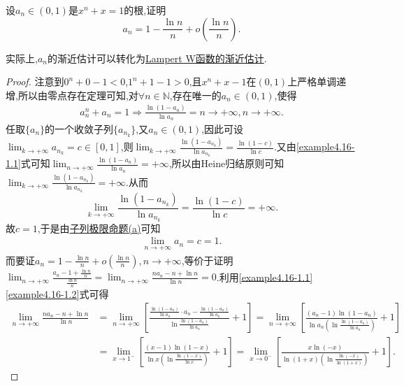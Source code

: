 \documentclass[../../main.tex]{subfiles}%
\begin{document}
\begin{example}
设\(a_n\in(0,1)\)是\(x^n + x = 1\)的根,证明
\[
a_n=1-\frac{\ln n}{n}+o\left(\frac{\ln n}{n}\right).
\]
\end{example}
\begin{note}
实际上,$a_n$的渐近估计可以转化为\hyperref[proposition:Lampert W 函数的渐近估计]{Lampert W函数的渐近估计}.
\end{note}
\begin{proof}

注意到\(0^n + 0 - 1 < 0\),\(1^n + 1 - 1 > 0\),且\(x^n + x - 1\)在\((0, 1)\)上严格单调递增,所以由零点存在定理可知,对\(\forall n\in \mathbb{N}\),存在唯一的\(a_n\in (0, 1)\),使得
\begin{align}\label{example4.16-1.1}
a_{n}^{n} + a_n = 1 \Rightarrow \frac{\ln(1 - a_n)}{\ln a_n} = n \rightarrow +\infty, n \rightarrow +\infty.  
\end{align}
任取\(\{ a_n \}\)的一个收敛子列\(\{ a_{n_k} \}\),又\(a_n\in (0, 1)\),因此可设\(\lim_{k\rightarrow +\infty}a_{n_k} = c\in [0, 1]\),则\(\lim_{k\rightarrow +\infty}\frac{\ln(1 - a_{n_k})}{\ln a_{n_k}} = \frac{\ln(1 - c)}{\ln c}\).又由\eqref{example4.16-1.1}式可知\(\lim_{n\rightarrow +\infty}\frac{\ln(1 - a_n)}{\ln a_n} = +\infty\),所以由Heine归结原则可知\(\lim_{k\rightarrow +\infty}\frac{\ln(1 - a_{n_k})}{\ln a_{n_k}} = +\infty\).从而
\[
\lim_{k\rightarrow +\infty}\frac{\ln(1 - a_{n_k})}{\ln a_{n_k}} = \frac{\ln(1 - c)}{\ln c} = +\infty.
\]
故\(c = 1\),于是由\hyperref[proposition:子列极限命题]{子列极限命题(a)}可知
\begin{align}\label{example4.16-1.2}
\lim_{n\rightarrow +\infty}a_n = c = 1.  
\end{align}
而要证\(a_n = 1 - \frac{\ln n}{n} + o\left(\frac{\ln n}{n}\right), n \rightarrow +\infty\),等价于证明\(\lim_{n\rightarrow +\infty}\frac{a_n - 1 + \frac{\ln n}{n}}{\frac{\ln n}{n}} = \lim_{n\rightarrow +\infty}\frac{na_n - n + \ln n}{\ln n} = 0\).利用\eqref{example4.16-1.1}\eqref{example4.16-1.2}式可得
\begin{align}
\underset{n\rightarrow +\infty}{\lim}\frac{na_n-n+\ln n}{\ln n}&=\underset{n\rightarrow +\infty}{\lim}\left[ \frac{\frac{\ln \left( 1-a_n \right)}{\ln a_n}\cdot a_n-\frac{\ln \left( 1-a_n \right)}{\ln a_n}}{\ln \frac{\ln \left( 1-a_n \right)}{\ln a_n}}+1 \right] =\underset{n\rightarrow +\infty}{\lim}\left[ \frac{\left( a_n-1 \right) \ln \left( 1-a_n \right)}{\ln a_n\left( \ln \frac{\ln \left( 1-a_n \right)}{\ln a_n} \right)}+1 \right] \nonumber
\\
&=\underset{x\rightarrow 1^-}{\lim}\left[ \frac{\left( x-1 \right) \ln \left( 1-x \right)}{\ln x\left( \ln \frac{\ln \left( 1-x \right)}{\ln x} \right)}+1 \right] =\underset{x\rightarrow 0^-}{\lim}\left[ \frac{x\ln \left( -x \right)}{\ln \left( 1+x \right) \left( \ln \frac{\ln \left( -x \right)}{\ln \left( 1+x \right)} \right)}+1 \right] .

\end{align}
\end{proof}
\end{document}
